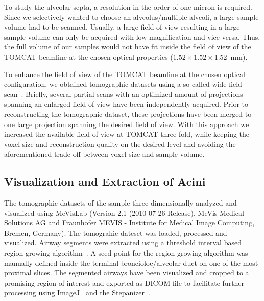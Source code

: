 \documentclass[%
	paper=a4,%
	DIV=calc,%
	twoside=true,%
	draft=true,%
	abstract=false]{scrartcl}
\begin{document}
To study the alveolar septa, a resolution in the order of one micron is required. Since we selectively wanted to choose an alveolus/multiple alveoli, a large sample volume had to be scanned. Usually, a large field of view resulting in a large sample volume can only be acquired with low magnification and vice-versa. Thus, the full volume of our samples would not have fit inside the field of view of the TOMCAT beamline at the chosen optical properties (\(1.52\times1.52\times\)\SI{1.52}{\milli\meter}).

To enhance the field of view of the TOMCAT beamline at the chosen optical configuration, we obtained tomographic datasets using a so called wide field scan~\cite{Haberthuer2010}. Briefly, several partial scans with an optimized amount of projections spanning an enlarged field of view have been independently acquired. Prior to reconstructing the tomographic dataset, these projections have been merged to one large projection spanning the desired field of view. With this approach we increased the available field of view at TOMCAT three-fold, while keeping the voxel size and reconstruction quality on the desired level and avoiding the aforementioned trade-off between voxel size and sample volume.

\subsection{Visualization and Extraction of Acini}
The tomographic datasets of the sample three-dimensionally analyzed and visualized using MeVisLab (Version 2.1 (2010-07-26 Release), MeVis Medical Solutions AG and Fraunhofer MEVIS - Institute for Medical Image Computing, Bremen, Germany). The tomograhic dateset was loaded, processed and visualized. Airway segments were extracted using a threshold interval based region growing algorithm~\cite{Zucker1976}. A seed point for the region growing algorithm was manually defined inside the terminal broncioloe/alveolar duct on one of the most proximal slices. The segmented airways have been visualized and cropped to a promising region of interest and exported as DICOM-file to facilitate further processing using ImageJ~\cite{Abramoff2004} and the Stepanizer~\cite{Tschanz2010}.
\end{document}
